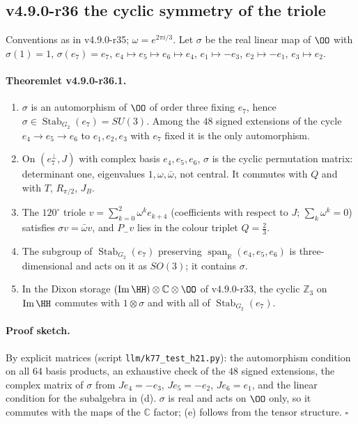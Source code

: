 \subsection*{v4.9.0-r36 the cyclic symmetry of the triole}
\label{subsec:v490-r36-results}

Conventions as in v4.9.0-r35; \(\omega=e^{2\pi i/3}\).  Let \(\sigma\) be the real linear map of \(\OO\) with \(\sigma(1)=1\),
\(\sigma(e_7)=e_7\), \(e_4\mapsto e_5\mapsto e_6\mapsto e_4\), \(e_1\mapsto-e_3\), \(e_2\mapsto-e_1\), \(e_3\mapsto e_2\).

\paragraph{Theoremlet v4.9.0-r36.1.}
\begin{enumerate}[leftmargin=2em]
\item[(a)] \(\sigma\) is an automorphism of \(\OO\) of order three fixing \(e_7\), hence \(\sigma\in\operatorname{Stab}_{G_2}(e_7)=SU(3)\).
Among the \(48\) signed extensions of the cycle \(e_4\to e_5\to e_6\) to \(e_1,e_2,e_3\) with \(e_7\) fixed it is the only
automorphism.
\item[(b)] On \((e_7^\perp,J)\) with complex basis \(e_4,e_5,e_6\), \(\sigma\) is the cyclic permutation matrix: determinant one,
eigenvalues \(1,\omega,\bar\omega\), not central.  It commutes with \(Q\) and with \(T\), \(R_{\pi/2}\), \(J_B\).
\item[(c)] The \(120^\circ\) triole \(v=\sum_{k=0}^{2}\omega^k e_{k+4}\) (coefficients with respect to \(J\); \(\sum_k\omega^k=0\))
satisfies \(\sigma v=\bar\omega v\), and \(P_-v\) lies in the colour triplet \(Q=\tfrac23\).
\item[(d)] The subgroup of \(\operatorname{Stab}_{G_2}(e_7)\) preserving \(\operatorname{span}_{\mathbb R}(e_4,e_5,e_6)\) is
three-dimensional and acts on it as \(SO(3)\); it contains \(\sigma\).
\item[(e)] In the Dixon storage \((\operatorname{Im}\HH)\otimes\mathbb C\otimes\OO\) of v4.9.0-r33, the cyclic \(\mathbb Z_3\) on
\(\operatorname{Im}\HH\) commutes with \(1\otimes\sigma\) and with all of \(\operatorname{Stab}_{G_2}(e_7)\).
\end{enumerate}

\paragraph{Proof sketch.}
By explicit matrices (script \texttt{llm/k77\_test\_h21.py}): the automorphism condition on all \(64\) basis products, an exhaustive
check of the \(48\) signed extensions, the complex matrix of \(\sigma\) from \(Je_4=-e_3\), \(Je_5=-e_2\), \(Je_6=e_1\), and the
linear condition for the subalgebra in (d).  \(\sigma\) is real and acts on \(\OO\) only, so it commutes with the maps of the
\(\mathbb C\) factor; (e) follows from the tensor structure.  \(\square\)

